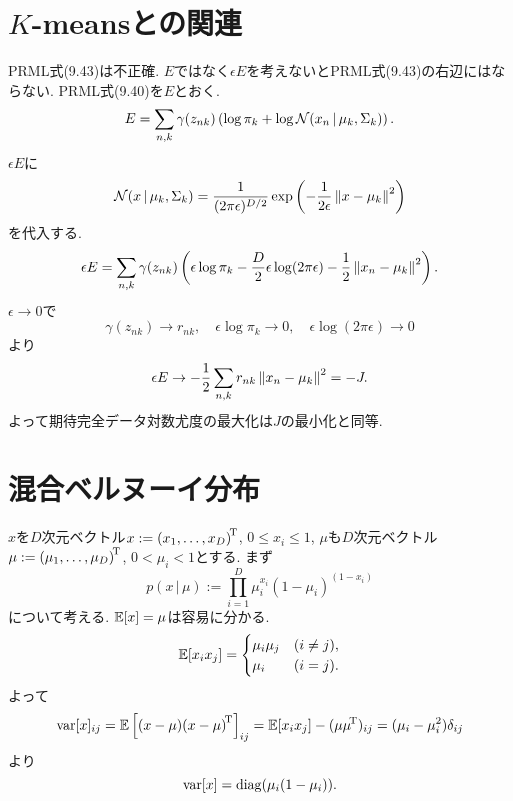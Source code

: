 \section{$K$-meansとの関連}
PRML式(9.43)は不正確. $E$ではなく$\epsilon E$を考えないとPRML式(9.43)の右辺にはならない.
PRML式(9.40)を$E$とおく.
$$
E=\sum_{n,k} \gamma(z_{nk})\left(\log \pi_k + \log {\cal N}(x_n\,|\,\mu_k,\Sigma_k)\right).
$$
$\epsilon E$に
$$
\calN(x\,|\,\mu_k,\Sigma_k)
=\frac{1}{(2\pi \epsilon)^{D/2}}
 \exp\left(-\frac{1}{2\epsilon}\Norm{x-\mu_k}^2\right)
$$
を代入する.
$$
\epsilon E = \sum_{n,k} \gamma(z_{nk}) \left(
               \epsilon \log \pi_k
               - \frac{D}{2}\epsilon \log (2\pi \epsilon)
               - \half\Norm{x_n-\mu_k}^2
             \right).
$$
$\epsilon \rightarrow 0$で
$$
\gamma(z_{nk}) \rightarrow r_{nk}, \quad
\epsilon \log \pi_k \rightarrow 0, \quad
\epsilon \log (2\pi \epsilon) \rightarrow 0
$$
より
$$
\epsilon E \rightarrow -\half\sum_{n,k} r_{nk} \Norm{x_n-\mu_k}^2 = -J.
$$
よって期待完全データ対数尤度の最大化は$J$の最小化と同等.

\section{混合ベルヌーイ分布}
$x$を$D$次元ベクトル$x:={(x_1,\ldots,x_D)}^{\!\mathrm{T}}$, $0\le x_i \le 1$,
$\mu$も$D$次元ベクトル$\mu:={(\mu_1, \ldots, \mu_D)}^{\!\mathrm{T}}$, $0 < \mu_i < 1$とする.
まず
$$
p(x\,|\,\mu):=\prod_{i=1}^D \mu_i^{x_i}(1-\mu_i)^{(1-x_i)}
$$
について考える. $\mathbb{E}[x]=\mu$は容易に分かる.
$$
\mathbb{E}[x_i x_j]=
\begin{cases}
\mu_i \mu_j & (i \ne j),\\
\mu_i & (i = j).
\end{cases}
$$
よって
$$
\mathop{\mathrm{var}}\nolimits[x]_{ij}=\mathbb{E}\left[(x-\mu){(x-\mu)}^{\!\mathrm{T}}\right]_{ij}=\mathbb{E}[x_i x_j]-(\mu{\mu}^{\!\mathrm{T}})_{ij}=(\mu_i - \mu_i^2)\delta_{ij}
$$
より
$$
\mathop{\mathrm{var}}\nolimits[x]=\mathop{\mathrm{diag}}\nolimits(\mu_i(1-\mu_i)).
$$

